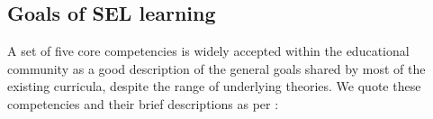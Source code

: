 \documentclass[prodmode,acmtochi]{acmsmall}
\newcommand{\todolater}[1]{}
\begin{document}
\todolater{Outline the theoretical background of PATHS, Incredible Years and RULER. What does this mean for technology?}







\subsection{Goals of SEL learning}
\label{sec:blocks}



%

A set of five core competencies is widely accepted within the educational community \cite{Zins2007,Durlak2011,CASEL2003,CASEL2013} as a good description of the general goals shared by most of the existing curricula, despite the range of underlying theories. We quote these competencies and their brief descriptions as per :
%
\end{document}
